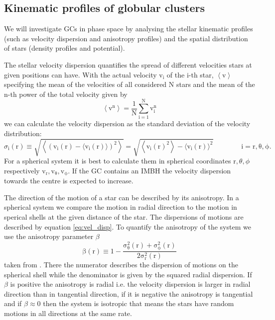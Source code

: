 \subsection{Kinematic profiles of globular clusters}\label{sec:kin_prof_theory}
We will investigate \acp{GC} in phase space by analysing the stellar kinematic profiles (such as velocity dispersion and anisotropy profiles) and the spatial distribution of stars (density profiles and potential). 
\par The stellar velocity dispersion quantifies the spread of different velocities stars at given positions can have. With the actual velocity \(\mathrm{v_i}\) of the i-th star, \(\left\langle \mathrm{v}\right\rangle\) specifying the mean of the velocities of all considered N stars and the mean of the n-th power of the total velocity given by
\begin{equation}
\mathrm{\left\langle \mathrm{v^n}\right\rangle=\frac{1}{N}\sum_{i=1}^Nv_i^n}
\end{equation}
 we can calculate the velocity dispersion as the standard deviation of the velocity distribution: 
\begin{equation}\label{eq:vel_disp}
\sigma_\mathrm{i}(\mathrm{r})\equiv\sqrt{\left\langle(\mathrm{v_i}(\mathrm{r})-\langle \mathrm{v_i}(\mathrm{r})\rangle)^2\right\rangle}=\sqrt{\left\langle \mathrm{v_i}(\mathrm{r})^2\right\rangle-\langle \mathrm{v_i}(\mathrm{r})\rangle^2} \qquad\qquad \mathrm{i=r,\theta,\phi}.
\end{equation}  For a spherical system it is best to calculate them in spherical coordinates \(\mathrm{r},\theta,\phi\) respectively \(\mathrm{v_r,v_{\theta},v_{\phi}}\). If the \ac{GC} contains an \ac{IMBH} the velocity dispersion towards the centre is expected to increase. 
\par The direction of the motion of a star can be described by its anisotropy. In a spherical system we compare the motion in radial direction to the motion in sperical shells at the given distance of the star. The dispersions of motions are described by equation \ref{eq:vel_disp}. To quantify the anisotropy of the system we use the anisotropy parameter \(\beta\) 
\begin{equation}\label{eq:anisotropy}
\mathrm{\beta(r)\equiv1-\frac{\sigma_\theta ^2(r)+\sigma_\phi ^2(r)}{2\sigma_r ^2(r)}}
\end{equation} taken from \citet[eq. 4.61]{2008gady.book.....B}. There the numerator describes the dispersion of motions on the spherical shell while the denominator is given by the squared radial dispersion. If \(\beta\) is positive the anisotropy is radial i.e. the velocity dispersion is larger in radial direction than in tangential direction, if it is negative the anisotropy is tangential and if \(\beta\approx0\) then the system is isotropic that means the stars have random motions in all directions at the same rate. 
